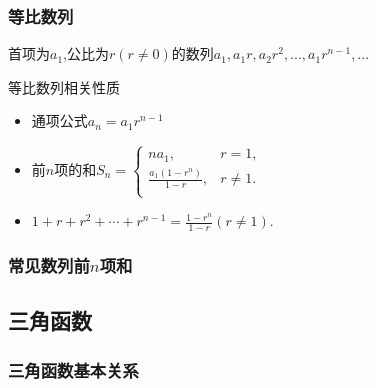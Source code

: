 \documentclass[12pt, a4paper, oneside, UTF8]{ctexbook}  %
\begin{document}
\begin{sloppypar}
    \subsubsection{等比数列}
    首项为$a_1$,公比为$r(r \neq 0)$的数列$a_1,a_1r,a_2r^2,...,a_1r^{n-1},...$
    \begin{criterion}{等比数列相关性质}{}
        \begin{itemize}
            \item 通项公式$a_n=a_1r^{n-1}$
            \item 前$n$项的和$S_{n}=\left\{\begin{matrix}{na_{1},}&{r=1,}\\{\frac{a_{1}\left(1-r^{n}\right)}{1-r},}&{r\neq1.}\\\end{matrix}\right.$
            \item $1+r+r^2+\cdots+r^{n-1}=\frac{1-r^n}{1-r}(r\neq1).$
        \end{itemize}
    \end{criterion}
    \subsubsection{常见数列前$n$项和}
    \begin{center}
    \end{center}

    \subsection{三角函数}
    \subsubsection{三角函数基本关系}
    \begin{center}
    \end{center}

\end{sloppypar}
\end{document}
